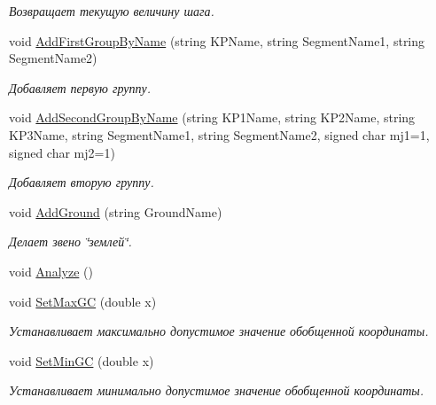 \begin{DoxyCompactItemize}
\begin{DoxyCompactList}\small\item\em Возвращает текущую величину шага. \item\end{DoxyCompactList}\item 
void \hyperlink{class_group_manager_a1c120746c1fc72043791c64c6e24699a}{AddFirstGroupByName} (string KPName, string SegmentName1, string SegmentName2)
\begin{DoxyCompactList}\small\item\em Добавляет первую группу. \item\end{DoxyCompactList}\item 
void \hyperlink{class_group_manager_ac9a283899c762a7b9d223068b49921d5}{AddSecondGroupByName} (string KP1Name, string KP2Name, string KP3Name, string SegmentName1, string SegmentName2, signed char mj1=1, signed char mj2=1)
\begin{DoxyCompactList}\small\item\em Добавляет вторую группу. \item\end{DoxyCompactList}\item 
void \hyperlink{class_group_manager_afbbb35e0682e1f8d09b157e28fd3b7ee}{AddGround} (string GroundName)
\begin{DoxyCompactList}\small\item\em Делает звено \char`\"{}землей\char`\"{}. \item\end{DoxyCompactList}\item 
void \hyperlink{class_group_manager_abbbf104fb7ed58d2113cdffbf070f0df}{Analyze} ()
\item 
void \hyperlink{class_group_manager_a2160abd085f628511331d8fb950ba226}{SetMaxGC} (double x)
\begin{DoxyCompactList}\small\item\em Устанавливает максимально допустимое значение обобщенной координаты. \item\end{DoxyCompactList}\item 
void \hyperlink{class_group_manager_a3902f2dd35ec3bad963310f67369a379}{SetMinGC} (double x)
\begin{DoxyCompactList}\small\item\em Устанавливает минимально допустимое значение обобщенной координаты. \item\end{DoxyCompactList}\item 

\end{DoxyCompactItemize}
